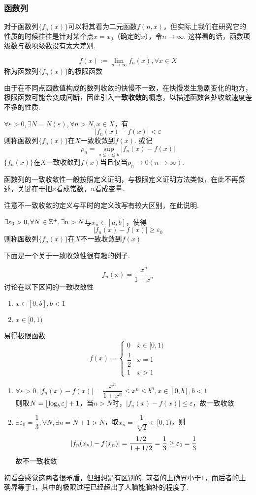 \subsubsection{函数列}
对于函数列$\{f_n(x)\}$可以将其看为二元函数$f(n,x)$，但实际上我们在研究它的性质的时候往往是针对某个点$x=x_0$（确定的$x$），令$n\to\infty$. 这样看的话，函数项级数与数项级数没有太大差别.
\begin{definition}[极限函数]
\[f(x):=\lim_{n\to\infty}f_n(x),\forall x\in X\]
称为函数列$\{f_n(x)\}$的极限函数
\end{definition}
由于在不同点函数值构成的数列收敛的快慢不一致，在快慢发生急剧变化的地方，极限函数可能会变成间断，因此引入\textbf{一致收敛}的概念，以描述函数各处收敛速度差不多的性质.
\begin{definition}[一致收敛]
$\forall \varepsilon>0,\exists N=N(\varepsilon),\forall n>N, x\in X$，有
\[|f_n(x)-f(x)|<\varepsilon\]
则称函数列$\{f_n(x)\}$在$X$一致收敛到$f(x)$. 或记
\[\rho_n=\sup_{a\leq x\leq b}|f_n(x)-f(x)|\]
$\{f_n(x)\}$在$X$一致收敛到$f(x)$当且仅当$\rho_n\to0(n\to\infty)$.
\end{definition}
\par 函数列的一致收敛性一般按照定义证明，与极限定义证明方法类似，在此不再赘述，关键在于把$x$看成常数，$n$看成变量.
\par 注意不一致收敛的定义与平时的定义改写有较大区别，在此说明.
\begin{definition}[不一致收敛]
$\exists \varepsilon_0>0,\forall N\in\mathbb{Z}^+,\exists n>N$与$x_n\in[a,b]$，使得
\[|f_n(x)-f(x)|\geq\varepsilon_0\]
则称函数列$\{f_n(x)\}$在$X$不一致收敛到$f(x)$
\end{definition}
\par 下面是一个关于一致收敛性很有趣的例子.
\begin{example}
\[f_n(x)=\dfrac{x^n}{1+x^n}\]
讨论在以下区间的一致收敛性
\begin{enumerate}
	\itemsep -3pt
	\item $x\in[0,b],b<1$
	\item $x\in[0,1)$
\end{enumerate}
\end{example}
\begin{analysis}易得极限函数
\[f(x)=\begin{cases}
0&x\in[0,1)\\
\dfrac{1}{2}&x=1\\
1&x>1
\end{cases}\]
\begin{enumerate}
	\item $\forall\varepsilon>0,|f_n(x)-f(x)|=\dfrac{x^n}{1+x^n}\leq x^n\leq b^n,x\in[0,b],b<1$\\
	则取$N=\lfloor\log_b\varepsilon\rfloor+1$，当$n>N$时，$|f_n(x)-f(x)|\leq \varepsilon$，故一致收敛
	\item $\exists\varepsilon_0=\dfrac{1}{3},\forall N,\exists n=N+1>N$，取$x_n=\dfrac{1}{\sqrt[n]{2}}\in[0,1)$，则
	\[|f_n(x_n)-f(x_n)|=\dfrac{1/2}{1+1/2}=\dfrac{1}{3}\geq\varepsilon_0=\dfrac{1}{3}\]
	故不一致收敛
\end{enumerate}
初看会感觉这两者很矛盾，但细想是有区别的. 前者的上确界小于$1$，而后者的上确界等于$1$，其中的极限过程已经超出了人脑能脑补的程度了.
\end{analysis}
